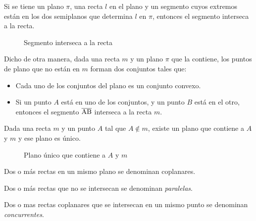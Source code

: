 \begin{postulate}
    Si se tiene un plano $\pi$, una recta $l$ en el plano y un segmento cuyos extremos están en los dos semiplanos que determina $l$ en $\pi$, entonces el segmento interseca a la recta.
    
    \begin{figure}[!h]
        \centering
        
        \caption{Segmento interseca a la recta}
        \label{fig:plot17}
    \end{figure}

    Dicho de otra manera, dada una recta $m$ y un plano $\pi$ que la contiene, los puntos de plano que no están en $m$ forman dos conjuntos tales que:

    \begin{itemize}
        \item Cada uno de los conjuntos del plano es un conjunto convexo.
        \item Si un punto $A$ está en uno de los conjuntos, y un punto $B$ está en el otro, entonces el segmento $\overline{\rm AB}$ interseca a la recta $m$.
    \end{itemize}
    
\end{postulate}

\begin{theorem}
    Dada una recta $m$ y un punto $A$ tal que $A \not \in m$, existe un plano que contiene a $A$ y $m$ y ese plano es único.
 
    \begin{figure}[!h]
        \centering
        
        \caption{Plano único que contiene a $A$ y $m$}
        \label{fig:plot23}
    \end{figure}
        
\end{theorem}

\begin{definition}
Dos o más rectas en un mismo plano se denominan coplanares.
\end{definition}

\begin{definition}
Dos o más rectas que no se intersecan se denominan \textit{paralelas}.
\end{definition}

\begin{definition}
Dos o mas rectas coplanares que se intersecan en un mismo punto se denominan \textit{concurrentes}.
\end{definition}

